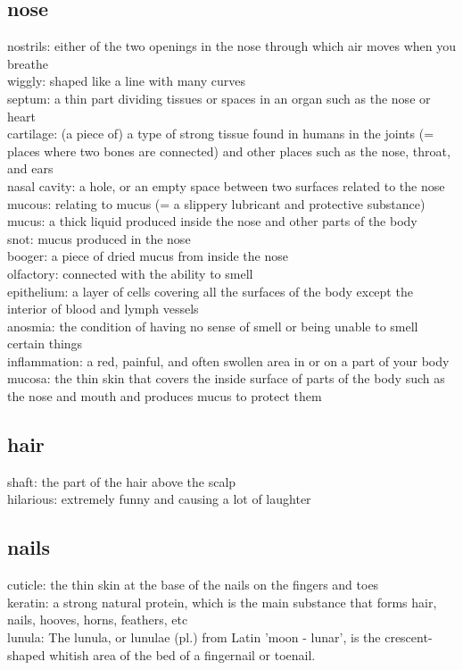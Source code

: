 \documentclass{article}
\begin{document}
\subsection{nose}
nostrils: either of the two openings in the nose through which air moves when you breathe\\
wiggly: shaped like a line with many curves\\
septum: a thin part dividing tissues or spaces in an organ such as the nose or heart\\
cartilage: (a piece of) a type of strong tissue found in humans in the joints (= places where two bones are connected) and other places such as the nose, throat, and ears\\
nasal cavity: a hole, or an empty space between two surfaces related to the nose \\
mucous: relating to mucus (= a slippery lubricant and protective substance)\\
mucus: a thick liquid produced inside the nose and other parts of the body\\
snot: mucus produced in the nose \\
booger: a piece of dried mucus from inside the nose \\
olfactory: connected with the ability to smell \\
epithelium: a layer of cells covering all the surfaces of the body except the interior of blood and lymph vessels\\
anosmia: the condition of having no sense of smell or being unable to smell certain things\\
inflammation: a red, painful, and often swollen area in or on a part of your body\\
mucosa: the thin skin that covers the inside surface of parts of the body such as the nose and mouth and produces mucus to protect them\\

\subsection{hair}
shaft: the part of the hair above the scalp\\
hilarious: extremely funny and causing a lot of laughter\\

\subsection{nails}
cuticle: the thin skin at the base of the nails on the fingers and toes\\
keratin: a strong natural protein, which is the main substance that forms hair, nails, hooves, horns, feathers, etc \\
lunula: The lunula, or lunulae (pl.) from Latin 'moon - lunar', is the crescent-shaped whitish area of the bed of a fingernail or toenail. \\
\end{document}
